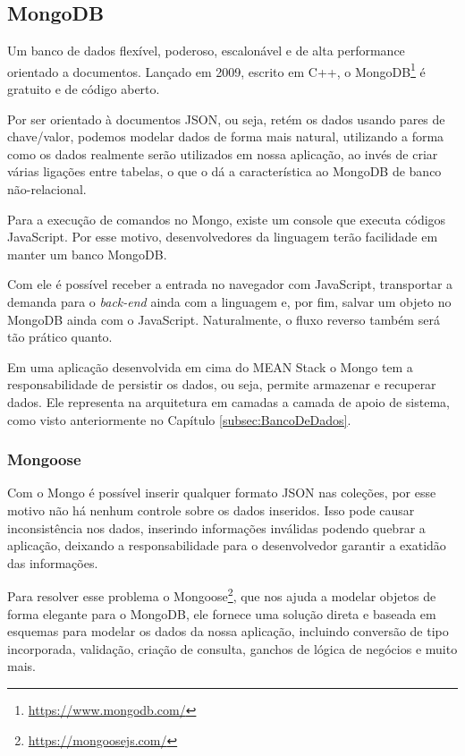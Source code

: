 \documentclass[
	12pt,				%
	openright,			%
	twoside,			%
	a4paper,			%
	english,			%
	brazil				%
	]{abntex2}
\begin{document}
\subsection{MongoDB}

Um banco de dados flexível, poderoso, escalonável e de alta performance orientado a documentos. Lançado em 2009, escrito em C++, o MongoDB\footnote{\url{https://www.mongodb.com/}} é gratuito e de código aberto.

Por ser orientado à documentos JSON, ou seja, retém os dados usando pares de chave/valor, podemos modelar dados de forma mais natural, utilizando a forma como os dados realmente serão utilizados em nossa aplicação, ao invés de criar várias ligações entre tabelas, o que o dá a característica ao MongoDB de banco não-relacional.

Para a execução de comandos no Mongo, existe um console que executa códigos JavaScript. Por esse motivo, desenvolvedores da linguagem terão facilidade em manter um banco MongoDB.

Com ele é possível receber a entrada no navegador com JavaScript, transportar a demanda para o \textit{back-end} ainda com a linguagem e, por fim, salvar um objeto no MongoDB ainda com o JavaScript. Naturalmente, o fluxo reverso também será tão prático quanto.

Em uma aplicação desenvolvida em cima do MEAN Stack o Mongo tem a responsabilidade de persistir os dados, ou seja, permite armazenar e recuperar dados. Ele representa na arquitetura em camadas a camada de apoio de sistema, como visto anteriormente no Capítulo \ref{subsec:BancoDeDados}.

\subsubsection{Mongoose}

Com o Mongo é possível inserir qualquer formato JSON nas coleções, por esse motivo não há nenhum controle sobre os dados inseridos. Isso pode causar inconsistência nos dados, inserindo informações inválidas podendo quebrar a aplicação, deixando a responsabilidade para o desenvolvedor garantir a exatidão das informações.

Para resolver esse problema o Mongoose\footnote{\url{https://mongoosejs.com/}}, que nos ajuda a modelar objetos de forma elegante para o MongoDB, ele fornece uma solução direta e baseada em esquemas para modelar os dados da nossa aplicação, incluindo conversão de tipo incorporada, validação, criação de consulta, ganchos de lógica de negócios e muito mais.
\end{document}
